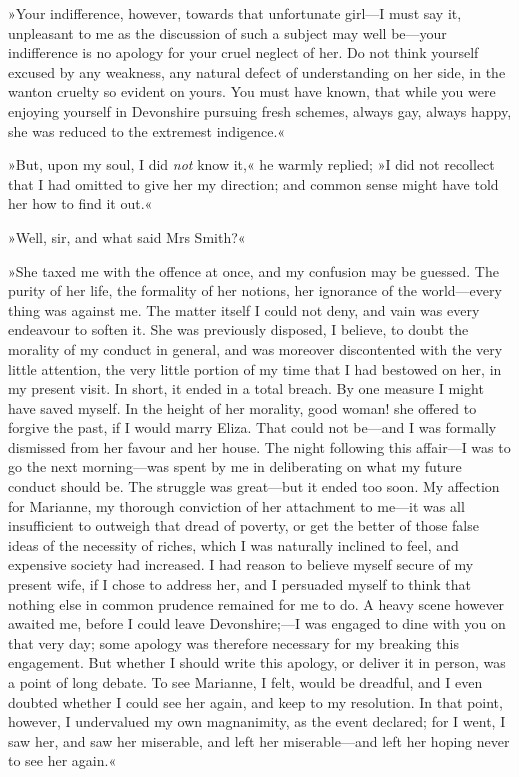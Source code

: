 »Your indifference, however, towards that unfortunate girl—I must say it, unpleasant to me as the discussion of such a subject may well be—your indifference is no apology for your cruel neglect of her. Do not think yourself excused by any weakness, any natural defect of understanding on her side, in the wanton cruelty so evident on yours. You must have known, that while you were enjoying yourself in Devonshire pursuing fresh schemes, always gay, always happy, she was reduced to the extremest indigence.«

»But, upon my soul, I did \textit{not} know it,« he warmly replied; »I did not recollect that I had omitted to give her my direction; and common sense might have told her how to find it out.«

»Well, sir, and what said Mrs Smith?«

»She taxed me with the offence at once, and my confusion may be guessed. The purity of her life, the formality of her notions, her ignorance of the world—every thing was against me. The matter itself I could not deny, and vain was every endeavour to soften it. She was previously disposed, I believe, to doubt the morality of my conduct in general, and was moreover discontented with the very little attention, the very little portion of my time that I had bestowed on her, in my present visit. In short, it ended in a total breach. By one measure I might have saved myself. In the height of her morality, good woman! she offered to forgive the past, if I would marry Eliza. That could not be—and I was formally dismissed from her favour and her house. The night following this affair—I was to go the next morning—was spent by me in deliberating on what my future conduct should be. The struggle was great—but it ended too soon. My affection for Marianne, my thorough conviction of her attachment to me—it was all insufficient to outweigh that dread of poverty, or get the better of those false ideas of the necessity of riches, which I was naturally inclined to feel, and expensive society had increased. I had reason to believe myself secure of my present wife, if I chose to address her, and I persuaded myself to think that nothing else in common prudence remained for me to do. A heavy scene however awaited me, before I could leave Devonshire;—I was engaged to dine with you on that very day; some apology was therefore necessary for my breaking this engagement. But whether I should write this apology, or deliver it in person, was a point of long debate. To see Marianne, I felt, would be dreadful, and I even doubted whether I could see her again, and keep to my resolution. In that point, however, I undervalued my own magnanimity, as the event declared; for I went, I saw her, and saw her miserable, and left her miserable—and left her hoping never to see her again.«

